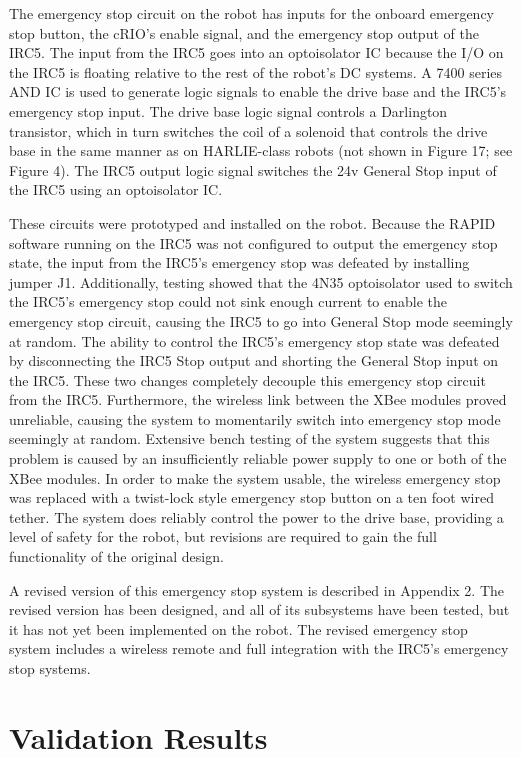 \documentclass[]{cwru} %
\begin{document}
The emergency stop circuit on the robot has inputs for the onboard
emergency stop button, the cRIO's enable signal, and the emergency stop
output of the IRC5. The input from the IRC5 goes into an optoisolator IC
because the I/O on the IRC5 is floating relative to the rest of the
robot's DC systems. A 7400 series AND IC is used to generate logic
signals to enable the drive base and the IRC5's emergency stop input.
The drive base logic signal controls a Darlington transistor, which in
turn switches the coil of a solenoid that controls the drive base in the
same manner as on HARLIE-class robots (not shown in Figure 17; see
Figure 4). The IRC5 output logic signal switches the 24v General Stop
input of the IRC5 using an optoisolator IC.

These circuits were prototyped and installed on the robot. Because the
RAPID software running on the IRC5 was not configured to output the
emergency stop state, the input from the IRC5's emergency stop was
defeated by installing jumper J1. Additionally, testing showed that the
4N35 optoisolator used to switch the IRC5's emergency stop could not
sink enough current to enable the emergency stop circuit, causing the
IRC5 to go into General Stop mode seemingly at random. The ability to
control the IRC5's emergency stop state was defeated by disconnecting
the IRC5 Stop output and shorting the General Stop input on the IRC5.
These two changes completely decouple this emergency stop circuit from
the IRC5. Furthermore, the wireless link between the XBee modules proved
unreliable, causing the system to momentarily switch into emergency stop
mode seemingly at random. Extensive bench testing of the system suggests
that this problem is caused by an insufficiently reliable power supply
to one or both of the XBee modules. In order to make the system usable,
the wireless emergency stop was replaced with a twist-lock style
emergency stop button on a ten foot wired tether. The system does
reliably control the power to the drive base, providing a level of
safety for the robot, but revisions are required to gain the full
functionality of the original design.

A revised version of this emergency stop system is described in Appendix
2. The revised version has been designed, and all of its subsystems have
been tested, but it has not yet been implemented on the robot. The
revised emergency stop system includes a wireless remote and full
integration with the IRC5's emergency stop systems.

\chapter{Validation Results}
\end{document}
